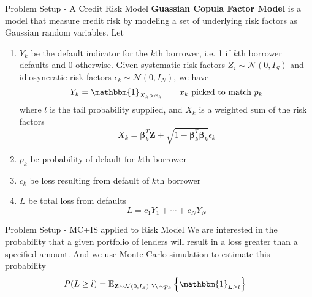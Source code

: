 \documentclass{beamer}
\newcommand{\matr}[1]{\mathbf{#1}}
\newcommand{\E}[2][]{\mathbb{E}_{#1}\left\{#2\right\}}
\newcommand{\normal}[1]{\mathcal{N}\left(#1\right)}
\newcommand{\bZ}{\matr{Z}}
\begin{document}
\begin{frame}{Problem Setup - A Credit Risk Model}
\textbf{Guassian Copula Factor Model} is a model that measure credit risk by modeling a set of underlying risk factors as Gaussian random variables. Let 
\begin{enumerate}
    \item $Y_k$ be the default indicator for the $k$th borrower, i.e. 1 if $k$th borrower defaults and 0 otherwise. Given systematic risk factors $Z_i \sim \normal{0,I_S}$ and idiosyncratic risk factors $\epsilon_k \sim \normal{0,I_N}$, we have
    \[
        Y_k = \mathbbm{1}_{X_k > x_k} \qquad \text{$x_k$ picked to match $p_k$}
    \]
    where $l$ is the tail probability supplied, and $X_k$ is a weighted sum of the risk factors
    \[
        X_k = \boldsymbol{\beta}_k^T \matr{Z}  + \sqrt{1 - \boldsymbol{\beta}_k^T \boldsymbol{\beta}_k} \epsilon_k
    \]
    \item $p_k$ be probability of default for $k$th borrower
    \item $c_k$ be loss resulting from default of $k$th borrower 
    \item $L$ be total loss from defaults
    \[
        L = c_1 Y_1 + \cdots + c_N Y_N    
    \]
\end{enumerate}
\end{frame}


\begin{frame}{Problem Setup - MC+IS applied to Risk Model}
We are interested in the probability that a given portfolio of lenders will result in a loss greater than a specified amount. And we use Monte Carlo simulation to estimate this probability
\begin{align*}
    P(L \geq l) 
    &= \E[\bZ \sim \normal{0, I_S}\,\, Y_k \sim p_k]{\mathbbm{1}_{L \geq l}}
\end{align*}
\end{frame}
\end{document}
